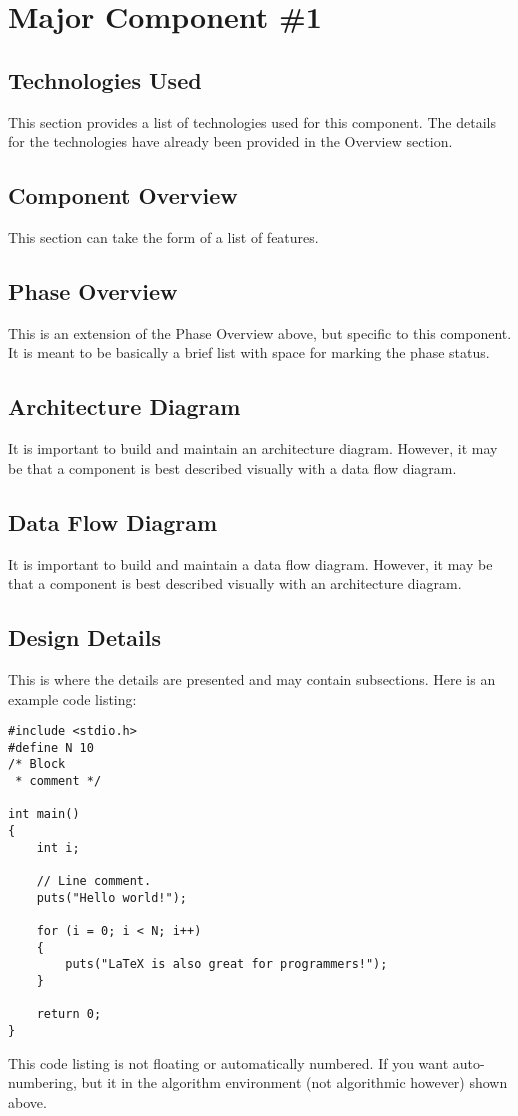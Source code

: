 \section{Major Component \#1 }

\subsection{Technologies  Used}
This section provides a list of technologies used for this component.  The details 
for the technologies have already been provided in the Overview section. 

\subsection{Component  Overview}
This section can take the form of a list of features. 

\subsection{Phase Overview}
This is an extension of the Phase Overview above, but specific to this component. 
 It is meant to be basically a brief list with space for marking the phase status. 

\subsection{ Architecture  Diagram}
It is important to build and maintain an architecture diagram.  However, it may 
be that a component is best described visually with a data flow diagram. 


\subsection{Data Flow Diagram}
It is important to build and maintain a data flow diagram.  However, it may be 
that a component is best described visually with an architecture diagram. 


\subsection{Design Details}
This is where the details are presented and may contain subsections.   Here is an example code listing:
\begin{lstlisting}
#include <stdio.h>
#define N 10
/* Block
 * comment */
 
int main()
{
    int i;
 
    // Line comment.
    puts("Hello world!");
 
    for (i = 0; i < N; i++)
    {
        puts("LaTeX is also great for programmers!");
    }
 
    return 0;
}
\end{lstlisting}
This code listing is not floating or automatically numbered.  If you want auto-numbering, but it in the algorithm environment (not algorithmic however) shown above.
